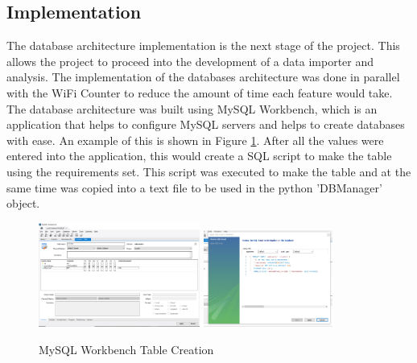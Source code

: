 \documentclass{report}
\begin{document}
\subsection{Implementation}
The database architecture implementation is the next stage of the project. This allows the project to proceed into the development of a data importer and analysis. The implementation of the databases architecture was done in parallel with the WiFi Counter to reduce the amount of time each feature would take. The database architecture was built using MySQL Workbench\cite{MySQLWorkbench}, which is an application that helps to configure MySQL servers and helps to create databases with ease. An example of this is shown in Figure \ref{fig:MySQL_Workbench}. After all the values were entered into the application, this would create a SQL script to make the table using the requirements set. This script was executed to make the table and at the same time was copied into a text file to be used in the python 'DBManager' object. \\ \newline
\begin{figure}[h!]
    \centering
    \includegraphics[width=200]{MySQL_workshop_1.PNG} 
    \includegraphics[width=160]{MySQL_workshop_2.PNG} 
    \caption{MySQL Workbench Table Creation\cite{MySQLWorkbench}}
    \label{fig:MySQL_Workbench}
\end{figure} \\
\end{document}
